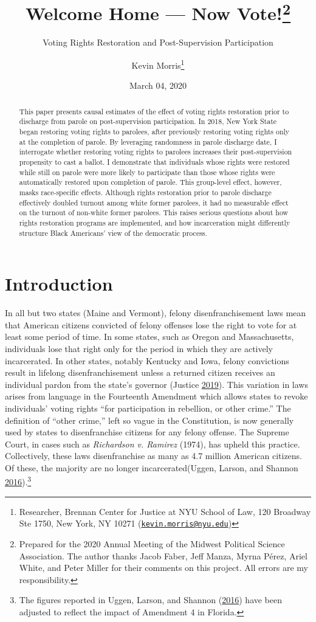 \documentclass[
  12pt,
]{article}
\title{Welcome Home --- Now Vote!\thanks{Prepared for the 2020 Annual Meeting of the Midwest Political Science Association. The author thanks Jacob Faber, Jeff Manza, Myrna Pérez, Ariel White, and Peter Miller for their comments on this project. All errors are my responsibility.}}
\subtitle{Voting Rights Restoration and Post-Supervision Participation}
\author{Kevin Morris\footnote{Researcher, Brennan Center for Justice at NYU School of Law, 120 Broadway Ste 1750, New York, NY 10271 (\href{mailto:kevin.morris@nyu.edu}{\nolinkurl{kevin.morris@nyu.edu}})}}
\date{March 04, 2020}
\begin{document}
\maketitle
\begin{abstract}
This paper presents causal estimates of the effect of voting rights restoration prior to discharge from parole on post-supervision participation. In 2018, New York State began restoring voting rights to parolees, after previously restoring voting rights only at the completion of parole. By leveraging randomness in parole discharge date, I interrogate whether restoring voting rights to parolees increases their post-supervision propensity to cast a ballot. I demonstrate that individuals whose rights were restored while still on parole were more likely to participate than those whose rights were automatically restored upon completion of parole. This group-level effect, however, masks race-specific effects. Although rights restoration prior to parole discharge effectively doubled turnout among white former parolees, it had no measurable effect on the turnout of non-white former parolees. This raises serious questions about how rights restoration programs are implemented, and how incarceration might differently structure Black Americans' view of the democratic process.
\end{abstract}

\pagebreak
\doublespacing


\hypertarget{introduction}{%
\section*{Introduction}\label{introduction}}

In all but two states (Maine and Vermont), felony disenfranchisement laws mean that American citizens convicted of felony offenses lose the right to vote for at least some period of time. In some states, such as Oregon and Massachusetts, individuals lose that right only for the period in which they are actively incarcerated. In other states, notably Kentucky and Iowa, felony convictions result in lifelong disenfranchisement unless a returned citizen receives an individual pardon from the state's governor (Justice \protect\hyperlink{ref-bcj_laws}{2019}). This variation in laws arises from language in the Fourteenth Amendment which allows states to revoke individuals' voting rights ``for participation in rebellion, or other crime.'' The definition of ``other crime,'' left so vague in the Constitution, is now generally used by states to disenfranchise citizens for any felony offense. The Supreme Court, in cases such as \emph{Richardson v. Ramirez} (1974), has upheld this practice. Collectively, these laws disenfranchise as many as 4.7 million American citizens. Of these, the majority are no longer incarcerated(Uggen, Larson, and Shannon \protect\hyperlink{ref-sentencing_2016}{2016}).\footnote{The figures reported in Uggen, Larson, and Shannon (\protect\hyperlink{ref-sentencing_2016}{2016}) have been adjusted to reflect the impact of Amendment 4 in Florida.}
\end{document}
